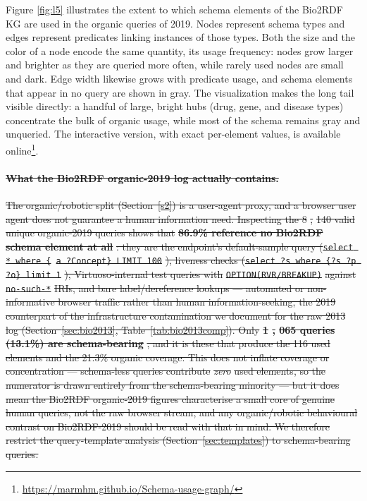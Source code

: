 \documentclass[sw]{iosart2x}
\providecommand{\DIFdel}[1]{{\protect\color{red}\sout{#1}}} %
\providecommand{\DIFdelbegin}{} %
\providecommand{\DIFscaledelfig}{0.5}
\newlength{\DIFdelgraphicswidth} %
\newlength{\DIFdelgraphicsheight} %
\providecommand{\DIFdelincludegraphics}[2][]{%
\sbox{\DIFdelgraphicsbox}{\DIFOincludegraphics[#1]{#2}}%
\settoboxwidth{\DIFdelgraphicswidth}{\DIFdelgraphicsbox} %
\settoboxtotalheight{\DIFdelgraphicsheight}{\DIFdelgraphicsbox} %
\scalebox{\DIFscaledelfig}{%
\parbox[b]{\DIFdelgraphicswidth}{\usebox{\DIFdelgraphicsbox}\\[-\baselineskip] \rule{\DIFdelgraphicswidth}{0em}}\llap{\resizebox{\DIFdelgraphicswidth}{\DIFdelgraphicsheight}{%
\setlength{\unitlength}{\DIFdelgraphicswidth}%
\begin{picture}(1,1)%
\thicklines\linethickness{2pt} %
{\color[rgb]{1,0,0}\put(0,0){\framebox(1,1){}}}%
{\color[rgb]{1,0,0}\put(0,0){\line( 1,1){1}}}%
{\color[rgb]{1,0,0}\put(0,1){\line(1,-1){1}}}%
\end{picture}%
}\hspace*{3pt}}} %
} %
\DeclareRobustCommand{\DIFdelbegin}{\DIFOdelbegin \let\includegraphics\DIFdelincludegraphics} %
\begin{document}
Figure \ref{fig:l5} illustrates the extent to which schema elements of the Bio2RDF KG are used in the organic queries of 2019. Nodes represent schema types and edges represent predicates linking instances of those types. Both the size and the color of a node encode the same quantity, its usage frequency: nodes grow larger and brighter as they are queried more often, while rarely used nodes are small and dark. Edge width likewise grows with predicate usage, and schema elements that appear in no query are shown in gray. The visualization makes the long tail visible directly: a handful of large, bright hubs (drug, gene, and disease types) concentrate the bulk of organic usage, while most of the schema remains gray and unqueried. The interactive version, with exact per-element values, is available online\footnote{\url{https://marmhm.github.io/Schema-usage-graph/}}.

\DIFdelbegin \paragraph{\textbf{\DIFdel{What the Bio2RDF organic-2019 log actually contains.}}%
} %
\addtocounter{paragraph}{-1}%
\DIFdel{The organic/robotic split (Section~\ref{s2}) is a user-agent proxy, and a browser user agent does not guarantee a human information need. Inspecting the 8}%
\DIFdel{,}%
\DIFdel{140 valid unique organic-2019 queries shows that }\textbf{\DIFdel{86.9\% reference no Bio2RDF schema element at all}}%
\DIFdel{: they are the endpoint's default-sample query (}\texttt{\DIFdel{select * where \{}%
\DIFdel{a ?Concept\} LIMIT 100}}%
\DIFdel{), liveness checks (}\texttt{\DIFdel{select ?s where \{?s ?p ?o\} limit 1}}%
\DIFdel{), Virtuoso-internal test queries with }\texttt{\DIFdel{OPTION(RVR/BREAKUP)}} %
\DIFdel{against }\texttt{\DIFdel{no-such-*}} %
\DIFdel{IRIs, and bare label/dereference lookups --- automated or non-informative browser traffic rather than human information-seeking, the 2019 counterpart of the infrastructure contamination we document for the raw 2013 log (Section~\ref{sec:bio2013}, Table~\ref{tab:bio2013comp}). Only }\textbf{\DIFdel{1}%
\DIFdel{,}%
\DIFdel{065 queries (13.1\%) are schema-bearing}}%
\DIFdel{, and it is these that produce the 116 used elements and the 21.3\% organic coverage. This does not inflate coverage or concentration --- schema-less queries contribute }\emph{\DIFdel{zero}} %
\DIFdel{used elements, so the numerator is drawn entirely from the schema-bearing minority --- but it does mean the Bio2RDF organic-2019 figures characterise a small core of genuine human queries, not the raw browser stream, and any organic/robotic behavioural contrast on Bio2RDF-2019 should be read with that in mind. We therefore restrict the query-template analysis (Section~\ref{sec:templates}) to schema-bearing queries.
}%
\end{document}
